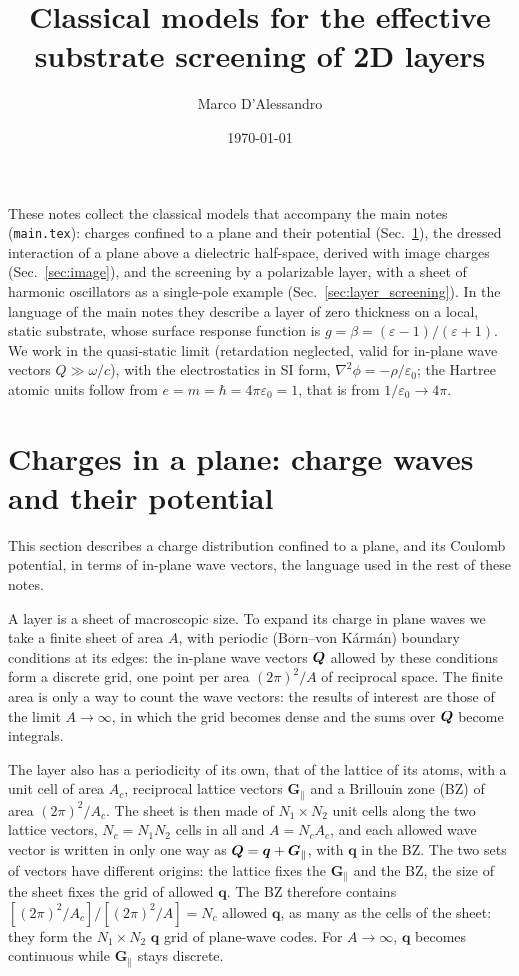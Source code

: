 \documentclass[10pt,a4paper]{paper}
\title{Classical models for the effective substrate screening of 2D layers}
\author{Marco D'Alessandro}
\date{\today}
\begin{document}
\maketitle

These notes collect the classical models that accompany the main notes (\texttt{main.tex}): charges confined to a
plane and their potential (Sec.~\ref{sec:charge_wave}), the dressed interaction of a plane above a dielectric
half-space, derived with image charges (Sec.~\ref{sec:image}), and the screening by a polarizable layer, with a sheet
of harmonic oscillators as a single-pole example (Sec.~\ref{sec:layer_screening}). In the language of the main notes
they describe a layer of zero thickness on a local, static substrate, whose surface response function is
$g = \beta = (\varepsilon - 1)/(\varepsilon + 1)$. We work in the quasi-static limit (retardation neglected, valid for
in-plane wave vectors $Q \gg \omega/c$), with the electrostatics in SI form, $\nabla^2\phi = -\rho/\varepsilon_0$; the
Hartree atomic units follow from $e = m = \hbar = 4\pi\varepsilon_0 = 1$, that is from $1/\varepsilon_0 \to 4\pi$.

\section{Charges in a plane: charge waves and their potential}
\label{sec:charge_wave}

This section describes a charge distribution confined to a plane, and its Coulomb potential, in terms of in-plane
wave vectors, the language used in the rest of these notes.

A layer is a sheet of macroscopic size. To expand its charge in plane waves we take a finite sheet of area $A$, with
periodic (Born--von K\'arm\'an) boundary conditions at its edges: the in-plane wave vectors $\bm{Q}$ allowed by these
conditions form a discrete grid, one point per area $(2\pi)^2/A$ of reciprocal space. The finite area is only a way
to count the wave vectors: the results of interest are those of the limit $A \to \infty$, in which the grid becomes
dense and the sums over $\bm{Q}$ become integrals.

The layer also has a periodicity of its own, that of the lattice of its atoms, with a unit cell of area $A_c$,
reciprocal lattice vectors $\bm{G}_{\parallel}$ and a Brillouin zone (BZ) of area $(2\pi)^2/A_c$. The sheet is then
made of $N_1 \times N_2$ unit cells along the two lattice vectors, $N_c = N_1N_2$ cells in all and $A = N_c A_c$, and
each allowed wave vector is written in only one way as $\bm{Q} = \bm{q} + \bm{G}_{\parallel}$, with $\bm{q}$ in the BZ.
The two sets of vectors have different origins: the lattice fixes the $\bm{G}_{\parallel}$ and the BZ, the size of
the sheet fixes the grid of allowed $\bm{q}$. The BZ therefore contains $[(2\pi)^2/A_c]/[(2\pi)^2/A] = N_c$ allowed
$\bm{q}$, as many as the cells of the sheet: they form the $N_1 \times N_2$ $\bm{q}$ grid of plane-wave codes. For
$A \to \infty$, $\bm{q}$ becomes continuous while $\bm{G}_{\parallel}$ stays discrete. 
\end{document}
